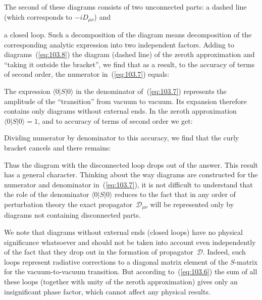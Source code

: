 \begin{equation}
\label{eq:103.8}
\end{equation}

The second of these diagrams consists of two unconnected parts: a dashed line (which corresponds to $-iD_{\mu\nu}$) and


\noindent a closed loop. Such a decomposition of the diagram means decomposition of the corresponding analytic expression into two independent factors. Adding to diagrams~(\ref{eq:103.8}) the diagram (dashed line) of the zeroth approximation and ``taking it outside the bracket'', we find that as a result, to the accuracy of terms of second order, the numerator in~(\ref{eq:103.7}) equals:


The expression $\langle 0|S|0\rangle$ in the denominator of~(\ref{eq:103.7}) represents the amplitude of the ``transition'' from vacuum to vacuum. Its expansion therefore contains only diagrams without external ends. In the zeroth approximation $\langle 0|S|0\rangle = 1$, and to accuracy of terms of second order we get:


Dividing numerator by denominator to this accuracy, we find that the curly bracket cancels and there remains:


Thus the diagram with the disconnected loop drops out of the answer. This result has a general character. Thinking about the way diagrams are constructed for the numerator and denominator in~(\ref{eq:103.7}), it is not difficult to understand that the role of the denominator $\langle 0|S|0\rangle$ reduces to the fact that in any order of perturbation theory the exact propagator~$\mathcal{D}_{\mu\nu}$ will be represented only by diagrams not containing disconnected parts.

We note that diagrams without external ends (closed loops) have no physical significance whatsoever and should not be taken into account even independently of the fact that they drop out in the formation of propagator~$\mathcal{D}$. Indeed, such loops represent radiative corrections to a diagonal matrix element of the $S$-matrix for the vacuum-to-vacuum transition. But according to~(\ref{eq:103.6}) the sum of all these loops (together with unity of the zeroth approximation) gives only an insignificant phase factor, which cannot affect any physical results.

